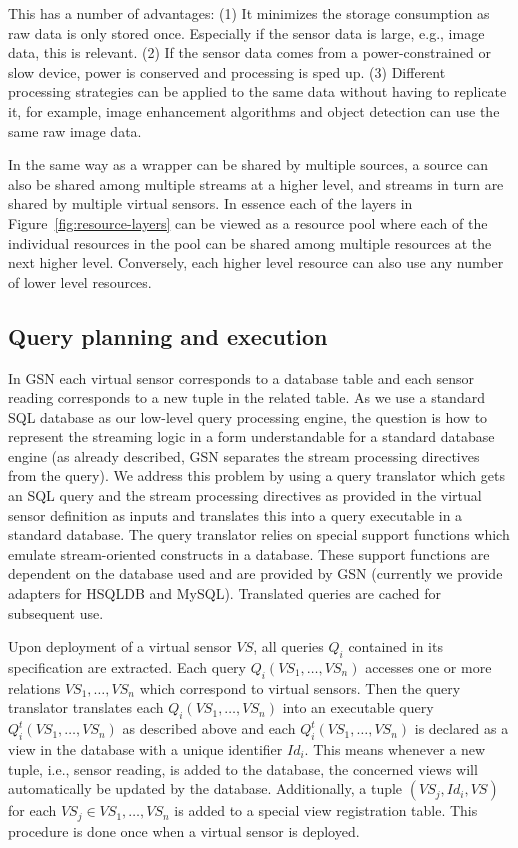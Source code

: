 This has a number of advantages: (1) It minimizes the storage consumption as
raw data is only stored once. Especially if the sensor data is large, e.g.,
image data, this is relevant. (2) If the sensor data comes from a
power-constrained or slow device, power is conserved and processing is sped up.
(3) Different processing strategies can be applied to the same data without
having to replicate it, for example, image enhancement algorithms and object
detection can use the same raw image data.

In the same way as a wrapper can be shared by multiple sources, a source
can also be shared among multiple streams at a higher level, and
streams in turn are shared by multiple virtual sensors. In essence each
of the layers in Figure~\ref{fig:resource-layers} can be viewed as a resource
pool where each of the individual resources in the pool can be shared among
multiple resources at the next higher level. Conversely, each higher level
resource can also use any number of lower level resources.

\subsection{Query planning and execution}
\label{sec:query-proc-optim}

In GSN each virtual sensor corresponds to a database table and each sensor
reading corresponds to a new tuple in the related table. As we use a standard
SQL database as our low-level query processing engine, the question is how to
represent the streaming logic in a form understandable for a standard database
engine (as already described, GSN separates the stream processing directives
from the query). We address this problem by using a query translator which gets
an SQL query and the stream processing directives as provided in the virtual
sensor definition as inputs and translates this into a query executable in a
standard database. The query translator relies on special support functions
which emulate stream-oriented constructs in a database. These support functions
are dependent on the database used and are provided by GSN (currently we
provide adapters for HSQLDB and MySQL). Translated queries are cached for subsequent use.

Upon deployment of a virtual sensor $VS$, all queries $Q_i$ contained in its
specification are extracted. Each query $Q_i(VS_1,\dots,VS_n)$ accesses one or
more relations $VS_1,\dots,VS_n$ which correspond to virtual sensors. Then the
query translator translates each $Q_i(VS_1,\dots,VS_n)$ into an executable
query $Q^t_i(VS_1,\dots,VS_n)$ as described above and each
$Q^t_i(VS_1,\dots,VS_n)$ is declared as a view in the database with a unique
identifier $Id_i$. This means whenever a new tuple, i.e., sensor reading, is
added to the database, the concerned views will automatically be updated by the
database. Additionally, a tuple $(VS_j, Id_i, VS)$ for each $VS_j \in
{VS_1,\dots,VS_n}$ is added to a special view registration table. This
procedure is done once when a virtual sensor is deployed.

